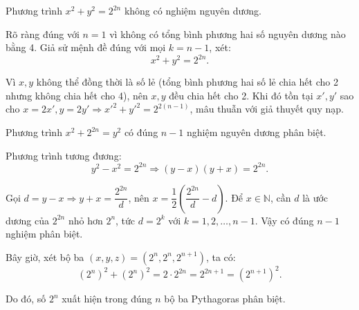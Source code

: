 \documentclass[../09-contruction-methods.tex]{subfiles}
\begin{document}
\begin{soln}\footnotemark
    \begin{claim*}
        Phương trình \( x^2 + y^2 = 2^{2n} \) không có nghiệm nguyên dương.
    \end{claim*}
    \begin{subproof}
        Rõ ràng đúng với \( n = 1 \) vì không có tổng bình phương hai số nguyên dương nào bằng 4. Giả sử mệnh đề đúng với mọi \( k = n - 1 \), xét:
        \[
            x^2 + y^2 = 2^{2n}.
        \]
        
        Vì \( x, y \) không thể đồng thời là số lẻ (tổng bình phương hai số lẻ chia hết cho 2 nhưng không chia hết cho 4), nên \( x, y \) đều chia hết cho 2.
        Khi đó tồn tại \( x', y' \) sao cho \( x = 2x', y = 2y' \Rightarrow x'^2 + y'^2 = 2^{2(n - 1)} \), mâu thuẫn với giả thuyết quy nạp.
    \end{subproof}

    \begin{claim*}
        Phương trình \( x^2 + 2^{2n} = y^2 \) có đúng \( n - 1 \) nghiệm nguyên dương phân biệt.
    \end{claim*}
    \begin{subproof}
        Phương trình tương đương:
        \[
            y^2 - x^2 = 2^{2n} \Rightarrow (y - x)(y + x) = 2^{2n}.
        \]
    
        Gọi \( d = y - x \Rightarrow y + x = \dfrac{2^{2n}}{d} \), nên \( x = \dfrac{1}{2}\left( \dfrac{2^{2n}}{d} - d \right) \).
        Để \( x \in \mathbb{N} \), cần \( d \) là ước dương của \( 2^{2n} \) nhỏ hơn \( 2^n \), tức \( d = 2^k \) với \( k = 1, 2, \dots, n - 1 \).
        Vậy có đúng \( n - 1 \) nghiệm phân biệt.
    \end{subproof}
    
    Bây giờ, xét bộ ba \( (x, y, z) = (2^n, 2^n, 2^{n+1}) \), ta có:
    \[
        (2^n)^2 + (2^n)^2 = 2 \cdot 2^{2n} = 2^{2n + 1} = (2^{n+1})^2.
    \]
    
    Do đó, số \( 2^{n} \) xuất hiện trong đúng \( n \) bộ ba Pythagoras phân biệt.    
\end{soln}

\end{document}
